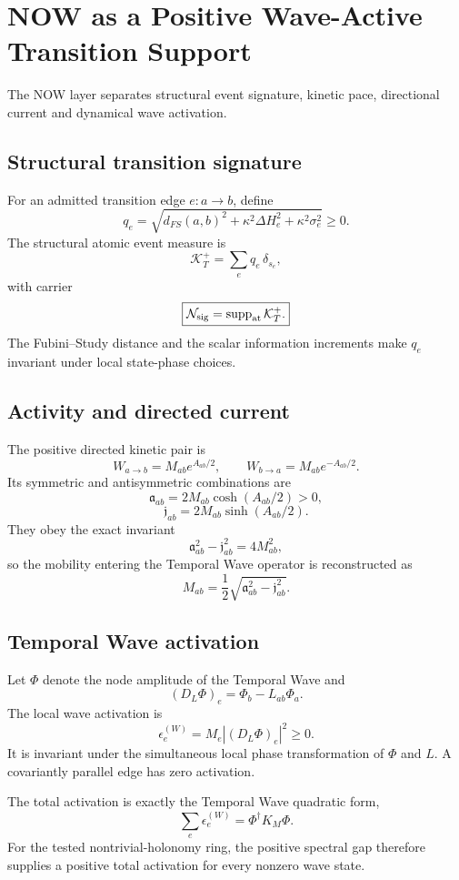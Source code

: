 \chapter{NOW as a Positive Wave-Active Transition Support}

The NOW layer separates structural event signature, kinetic pace, directional current and dynamical wave activation.

\section{Structural transition signature}

For an admitted transition edge $e:a\to b$, define
\[
\boxed{
q_e=
\sqrt{
 d_{FS}(a,b)^2
 +\kappa^2\Delta H_e^2
 +\kappa^2\sigma_e^2
}\ge0.
}
\]
The structural atomic event measure is
\[
\mathcal K_T^+
=\sum_e q_e\,\delta_{s_e},
\]
with carrier
\[
\boxed{
\mathcal N_{\rm sig}
=\operatorname{supp}_{\rm at}\mathcal K_T^+.
}
\]
The Fubini--Study distance and the scalar information increments make $q_e$ invariant under local state-phase choices.

\section{Activity and directed current}

The positive directed kinetic pair is
\[
W_{a\to b}=M_{ab}e^{A_{ab}/2},
\qquad
W_{b\to a}=M_{ab}e^{-A_{ab}/2}.
\]
Its symmetric and antisymmetric combinations are
\[
\boxed{
\mathfrak a_{ab}=2M_{ab}\cosh(A_{ab}/2)>0,
}
\]
\[
\boxed{
\mathfrak j_{ab}=2M_{ab}\sinh(A_{ab}/2).
}
\]
They obey the exact invariant
\[
\boxed{
\mathfrak a_{ab}^2-\mathfrak j_{ab}^2=4M_{ab}^2,
}
\]
so the mobility entering the Temporal Wave operator is reconstructed as
\[
\boxed{
M_{ab}
=\frac12\sqrt{\mathfrak a_{ab}^2-\mathfrak j_{ab}^2}.
}
\]

\section{Temporal Wave activation}

Let $\Phi$ denote the node amplitude of the Temporal Wave and
\[
(D_L\Phi)_e=\Phi_b-L_{ab}\Phi_a.
\]
The local wave activation is
\[
\boxed{
\epsilon_e^{(W)}
=M_e|(D_L\Phi)_e|^2\ge0.
}
\]
It is invariant under the simultaneous local phase transformation of $\Phi$ and $L$.  A covariantly parallel edge has zero activation.

The total activation is exactly the Temporal Wave quadratic form,
\[
\boxed{
\sum_e\epsilon_e^{(W)}
=\Phi^\dagger K_M\Phi.
}
\]
For the tested nontrivial-holonomy ring, the positive spectral gap therefore supplies a positive total activation for every nonzero wave state.

